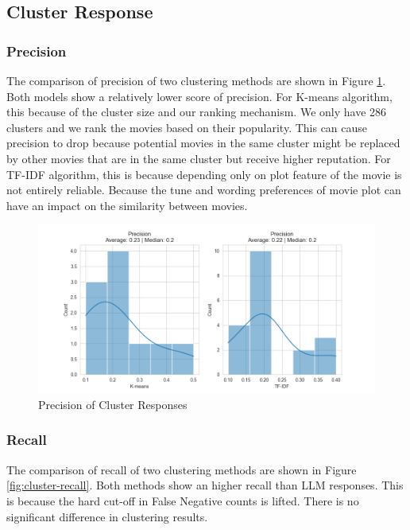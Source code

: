\documentclass[journal]{IEEEtran}
\theoremstyle{mydefstyle}
\begin{document}
\subsection{Cluster Response}
\subsubsection{Precision}
The comparison of precision of two clustering methods are shown in Figure \ref{fig:cluster-precision}. Both models show a relatively lower score of precision. For K-means algorithm, this because of the cluster size and our ranking mechanism. We only have 286 clusters and we rank the movies based on their popularity. This can cause precision to drop because potential movies in the same cluster might be replaced by other movies that are in the same cluster but receive higher reputation. For TF-IDF algorithm, this is because depending only on plot feature of the movie is not entirely reliable. Because the tune and wording preferences of movie plot can have an impact on the similarity between movies.

\begin{figure}
    \centering
    \includegraphics[width=1\linewidth]{doc//report//assets/precision-comparison.png}
    \caption{Precision of Cluster Responses}
    \label{fig:cluster-precision}
\end{figure}


\subsubsection{Recall}
The comparison of recall of two clustering methods are shown in Figure \ref{fig:cluster-recall}. Both methods show an higher recall than LLM responses. This is because the hard cut-off in False Negative counts is lifted. There is no significant difference in clustering results.
\end{document}
